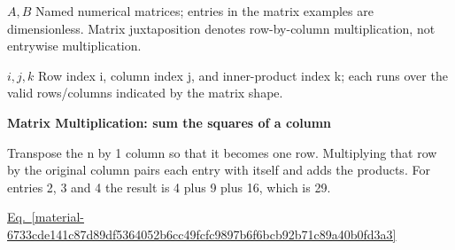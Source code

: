 \documentclass[11pt,a4paper]{article}
\begin{document}
\begin{minipage}{\linewidth}
\par\noindent\textbf{\(A,B\)} Named numerical matrices; entries in the matrix examples are dimensionless. Matrix juxtaposition denotes row-by-column multiplication, not entrywise multiplication.

\par\noindent\textbf{\(i,j,k\)} Row index i, column index j, and inner-product index k; each runs over the valid rows/columns indicated by the matrix shape.

\end{minipage}\par
\medskip

\textbf{Matrix Multiplication: sum the squares of a column}


Transpose the n by 1 column so that it becomes one row. Multiplying that row by the original column pairs each entry with itself and adds the products. For entries 2, 3 and 4 the result is 4 plus 9 plus 16, which is 29.


\hyperref[material-6733cde141c87d89df5364052b6cc49fcfc9897b6f6bcb92b71c89a40b0fd3a3]{Eq.~\ref*{material-6733cde141c87d89df5364052b6cc49fcfc9897b6f6bcb92b71c89a40b0fd3a3}}
\end{document}

